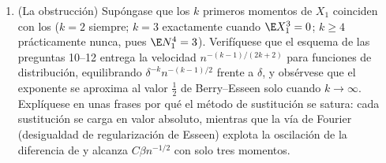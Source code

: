 \begin{problem}
\begin{enumerate}[resume]
{  $\norm{\psi_\delta^{(4)}}_{L^1} =
        K_2\delta^{-3}$ y $M_4 = K'\delta^{-4}$; elíjase
        $\delta = n^{-1/4}$)}.
  \item (La obstrucción) Supóngase que los $k$ primeros momentos de
  $X_1$ coinciden con los 
  ($k = 2$ siempre; $k = 3$ exactamente cuando $\E X_1^3 = 0$;
  $k \geq 4$ prácticamente nunca, pues $\E N_1^4 = 3$). Verifíquese que
  el esquema de las preguntas 10--12 entrega la velocidad
  $n^{-(k-1)/(2k+2)}$ para funciones de distribución, equilibrando
  $\delta^{-k}n^{-(k-1)/2}$ frente a $\delta$, y obsérvese que el
  exponente se aproxima al valor $\frac12$ de Berry--Esseen solo cuando
  $k \to
        \infty$. Explíquese en unas frases por qué el método de
  sustitución se satura: cada sustitución se carga en valor absoluto,
  mientras que la vía de Fourier (desigualdad de regularización de
  Esseen) explota la oscilación de la diferencia de  y alcanza $C\beta n^{-1/2}$ con solo tres momentos.
\end{enumerate}


\end{problem}
